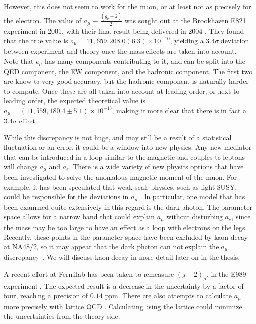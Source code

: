 However, this does not seem to work for the muon, or at least not as precisely for the electron.
The value of $a_\mu \equiv \frac{(g_\mu-2)}{2}$ was sought out at the Brookhaven E821 experiment in 2001, with their final result being delivered in 2004 \cite{Hagiwara:2006jt}.
They found that the true value is $a_\mu = 11,659,208.0(6.3)\times 10^{-10}$, yielding a $3.4\sigma$ deviation between experiment and theory once the mass effects are taken into account.
Note that $a_\mu$ has many components contributing to it, and can be split into the QED component, the EW component, and the hadronic component.
The first two are know to very good accuracy, but the hadronic component is naturally harder to compute.
Once these are all taken into account at leading order, or next to leading order, the expected theoretical value is $a_\mu = (11,659,180.4 \pm 5.1)\times 10^{-10}$, making it more clear that there is in fact a $3.4\sigma$ effect.

While this discrepancy is not huge, and may still be a result of a statistical fluctuation or an error, it could be a window into new physics.
Any new mediator that can be introduced in a loop similar to the magnetic and couples to leptons will change $a_\mu$ and $a_e$.
There is a wide variety of new physics options that have been investigated to solve the anomalous magnetic moment of the muon.
For example, it has been speculated that weak scale physics, such as light SUSY, could be responsible for the deviations in $a_\mu$ \cite{Czarnecki:2001pv}.
In particular, one model that has been examined quite extensively in this regard is the dark photon.
The parameter space allows for a narrow band that could explain $a_\mu$ without disturbing $a_e$, since the mass may be too large to have an effect as a loop with electrons on the legs.
Recently, these points in the parameter space have been excluded by kaon decay at NA48/2, so it may appear that the dark photon can not explain the $a_\mu$ discrepancy~\cite{Batley:2015lha}.
We will discuss kaon decay in more detail later on in the thesis.

A recent effort at Fermilab has been taken to remeasure $(g-2)_\mu$, in the E989 experiment \cite{Venanzoni:2014ixa}.
The expected result is a decrease in the uncertainty by a factor of four, reaching a precision of $0.14$ ppm.
There are also attempts to calculate $a_\mu$ more precisely with lattice QCD \cite{Juttner:2009yb, Renner:2010zj, Malak:2015sla}.
Calculating using the lattice could minimize the uncertainties from the theory side.
